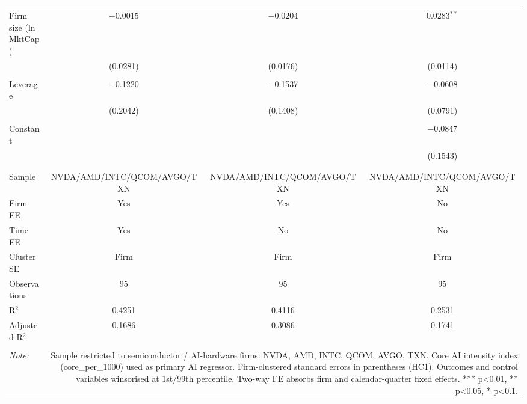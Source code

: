 \begin{table}[!htbp]
\begin{tabular}{@{\extracolsep{5pt}}lccc}
  & & & \\ 
 Firm size (ln MktCap) & $-$0.0015 & $-$0.0204 & 0.0283$^{**}$ \\ 
  & (0.0281) & (0.0176) & (0.0114) \\ 
  & & & \\ 
 Leverage & $-$0.1220 & $-$0.1537 & $-$0.0608 \\ 
  & (0.2042) & (0.1408) & (0.0791) \\ 
  & & & \\ 
 Constant &  &  & $-$0.0847 \\ 
  &  &  & (0.1543) \\ 
  & & & \\ 
\hline \\[-1.8ex] 
Sample & NVDA/AMD/INTC/QCOM/AVGO/TXN & NVDA/AMD/INTC/QCOM/AVGO/TXN & NVDA/AMD/INTC/QCOM/AVGO/TXN \\ 
Firm FE & Yes & Yes & No \\ 
Time FE & Yes & No & No \\ 
Cluster SE & Firm & Firm & Firm \\ 
Observations & 95 & 95 & 95 \\ 
R$^{2}$ & 0.4251 & 0.4116 & 0.2531 \\ 
Adjusted R$^{2}$ & 0.1686 & 0.3086 & 0.1741 \\ 
\hline 
\hline \\[-1.8ex] 
\textit{Note:}  & \multicolumn{3}{r}{Sample restricted to semiconductor / AI-hardware firms: NVDA, AMD, INTC, QCOM, AVGO, TXN. Core AI intensity index (core_per_1000) used as primary AI regressor. Firm-clustered standard errors in parentheses (HC1). Outcomes and control variables winsorised at 1st/99th percentile. Two-way FE absorbs firm and calendar-quarter fixed effects. *** p<0.01, ** p<0.05, * p<0.1.} \\ 
\end{tabular} 
\end{table} 
